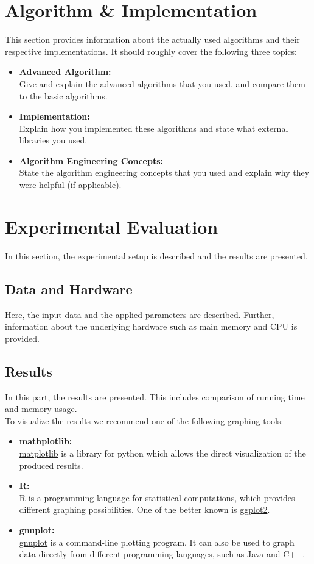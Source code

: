 \documentclass[twocolumn]{article}
\begin{document}
\section{Algorithm \& Implementation}
This section provides information about the actually used algorithms and their respective implementations. It should roughly cover the following three topics:
\begin{itemize}
	\item \textbf{Advanced Algorithm:}\\
		Give and explain the advanced algorithms that you used, and compare them to the basic algorithms.
	\item \textbf{Implementation:}\\
		Explain how you implemented these algorithms and state what external libraries you used.
	\item \textbf{Algorithm Engineering Concepts:}\\
		State the algorithm engineering concepts that you used and explain why they were helpful (if applicable).
\end{itemize}

\section{Experimental Evaluation}
In this section, the experimental setup is described and the results are presented.

\subsection{Data and Hardware}%
\label{sub:Data and Hardware}
Here, the input data and the applied parameters are described. Further, information about the underlying hardware such as main memory and CPU is provided.

\subsection{Results}%
\label{sub:Results}
In this part, the results are presented. This includes comparison of running time and memory usage.\\
To visualize the results we recommend one of the following graphing tools:
\begin{itemize}
	\item \textbf{mathplotlib:}\\ 
		\href{https://matplotlib.org/}{matplotlib} is a library for python which allows the direct visualization of the produced results.
	\item \textbf{R:}\\
		R is a programming language for statistical computations, which provides different graphing possibilities. One of the better known is \href{https://ggplot2.tidyverse.org/}{ggplot2}.
	\item \textbf{gnuplot:}\\
		\href{http://www.gnuplot.info/}{gnuplot} is a command-line plotting program. It can also be used to graph data directly from different programming languages, such as Java and C++.
\end{itemize}
\end{document}

